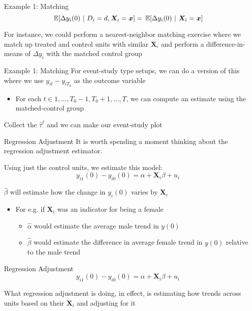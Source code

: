 \documentclass[aspectratio=169,t,11pt,table]{beamer}
\begin{document}
\begin{frame}{Example 1: Matching}
  \vspace*{-\bigskipamount}
  $$
    \expec{\Delta y_i(0)}{D_i = d, \bm{X}_i = \bm{x}} = \expec{\Delta y_i(0)}{\bm{X}_i = \bm{x}}
  $$

  \bigskip
  For instance, we could perform a nearest-neighbor matching exercise where we match up treated and control units with similar $\bm{X}_i$ and perform a difference-in-means of $\Delta y_i$ with the matched control group
\end{frame}

\begin{frame}{Example 1: Matching}
  For event-study type setups, we can do a version of this where
  we use $y_{it} - y_{iT_0}$ as the outcome variable
  \begin{itemize}
    \item For each $t \in 1, \dots, T_0 - 1, T_0 + 1, \dots, T$, we can compute an estimate using the matched-control group 
  \end{itemize}

  \bigskip
  Collect the $\hat{\tau}^\ell$ and we can make our event-study plot
\end{frame}

\begin{frame}{Regression Adjustment}
  It is worth spending a moment thinking about the regression adjustment estimator. 
  
  Using just the control units, we estimate this model:
  $$
    y_{i1}(0) - y_{i0}(0) = \alpha + \bm{X}_i \beta + u_i
  $$

  \pause
  \bigskip
  $\hat{\beta}$ will estimate how the change in $y_i(0)$ varies by $\bm{X}_i$
  \begin{itemize}
    \item For e.g. if $\bm{X}_i$ was an indicator for being a female
    \begin{itemize}
      \item $\hat{\alpha}$ would estimate the average male trend in $y(0)$
      
      \item $\hat{\beta}$ would estimate the difference in average female trend in $y(0)$ relative to the male trend 
    \end{itemize}
  \end{itemize}
\end{frame}

\begin{frame}{Regression Adjustment}
  \vspace*{-\bigskipamount}
  $$
    y_{i1}(0) - y_{i0}(0) = \alpha + \bm{X}_i \beta + u_i
  $$
  
  What regression adjustment is doing, in effect, is estimating how trends across units based on their $\bm{X}_i$ and adjusting for it
\end{frame}
\end{document}
